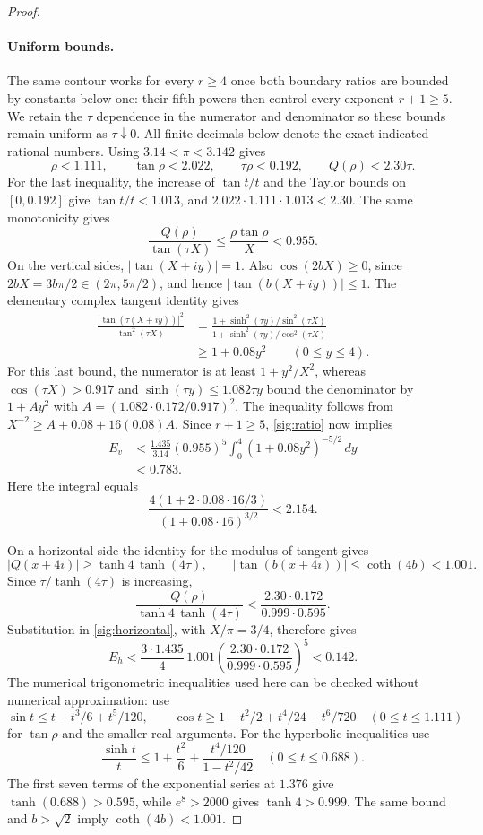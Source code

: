 \begin{proof}
\paragraph{Uniform bounds.}
The same contour works for every $r\ge4$ once both boundary ratios
are bounded by constants below one: their fifth powers then control
every exponent $r+1\ge5$. We retain the $\tau$ dependence in the
numerator and denominator so these bounds remain uniform as
$\tau\downarrow0$. All finite decimals below
denote the exact indicated rational numbers. Using
$3.14<\pi<3.142$ gives
\[
 \rho<1.111,\qquad \tan\rho<2.022,\qquad
 \tau\rho<0.192,\qquad Q(\rho)<2.30\tau.
\]
For the last inequality, the increase of $\tan t/t$ and the
Taylor bounds on $[0,0.192]$ give $\tan t/t<1.013$,
and $2.022\cdot1.111\cdot1.013<2.30$.
The same monotonicity gives
\begin{equation}\label{sig:ratio}
 \frac{Q(\rho)}{\tan(\tau X)}
 \le\frac{\rho\tan\rho}{X}<0.955.
\end{equation}
On the vertical sides, $|\tan(X+iy)|=1$.
Also $\cos(2bX)\ge0$, since
$2bX=3b\pi/2\in(2\pi,5\pi/2)$, and hence
$|\tan(b(X+iy))|\le1$.
The elementary complex tangent identity gives
\begin{align*}
 \frac{|\tan(\tau(X+iy))|^2}{\tan^2(\tau X)}
 &=\frac{1+\sinh^2(\tau y)/\sin^2(\tau X)}
         {1+\sinh^2(\tau y)/\cos^2(\tau X)}\\
 &\ge 1+0.08y^2\qquad(0\le y\le4).
\end{align*}
For this last bound, the numerator is at least $1+y^2/X^2$,
whereas $\cos(\tau X)>0.917$ and
$\sinh(\tau y)\le1.082\tau y$ bound the denominator by
$1+Ay^2$ with $A=(1.082\cdot0.172/0.917)^2$.
The inequality follows from
$X^{-2}\ge A+0.08+16(0.08)A$.
Since $r+1\ge5$, \eqref{sig:ratio} now implies
\begin{align*}
 E_v
 &<\frac{1.435}{3.14}(0.955)^5
      \int_0^4(1+0.08y^2)^{-5/2}\,dy\\
 &<0.783.
\end{align*}
Here the integral equals
\[
 \frac{4(1+2\cdot0.08\cdot16/3)}{(1+0.08\cdot16)^{3/2}}
 <2.154.
\]

On a horizontal side the identity for the modulus of tangent
gives
\[
 |Q(x+4i)|\ge\tanh4\,\tanh(4\tau),\qquad
 |\tan(b(x+4i))|\le\coth(4b)<1.001.
\]
Since $\tau/\tanh(4\tau)$ is increasing,
\[
 \frac{Q(\rho)}{\tanh4\,\tanh(4\tau)}
 <\frac{2.30\cdot0.172}{0.999\cdot0.595}.
\]
Substitution in \eqref{sig:horizontal}, with $X/\pi=3/4$,
therefore gives
\[
 E_h<\frac{3\cdot1.435}{4}\,1.001
       \left(\frac{2.30\cdot0.172}{0.999\cdot0.595}\right)^5
 <0.142.
\]
The numerical trigonometric inequalities used here can be checked
without numerical approximation: use
\[
 \sin t\le t-t^3/6+t^5/120,\qquad
 \cos t\ge1-t^2/2+t^4/24-t^6/720
 \quad(0\le t\le1.111)
\]
for $\tan\rho$ and the smaller real arguments. For the
hyperbolic inequalities use
\[
 \frac{\sinh t}{t}\le1+\frac{t^2}{6}
       +\frac{t^4/120}{1-t^2/42}\quad(0\le t\le0.688).
\]
The first seven terms of the exponential series at $1.376$
give $\tanh(0.688)>0.595$, while $e^8>2000$ gives
$\tanh4>0.999$. The same bound and $b>\sqrt2$ imply
$\coth(4b)<1.001$.


\end{proof}
